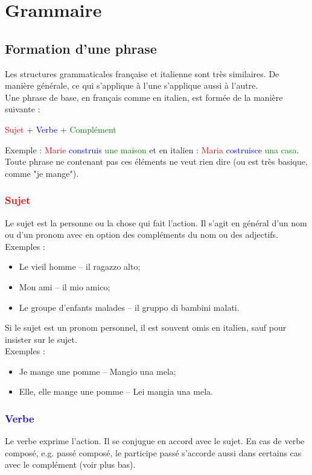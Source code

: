 \documentclass[12pt, openany]{report}
\begin{document}
\chapter{Grammaire}
\section{Formation d'une phrase}
Les structures grammaticales française et italienne sont très similaires. De manière générale, ce qui s'applique à l'une s'applique aussi à l'autre.\\
Une phrase de base, en français comme en italien, est formée de la manière suivante : 
\begin{center}
    \textcolor{red}{Sujet} + \textcolor{blue}{Verbe} + \textcolor{green}{Complément}
\end{center}
Exemple : \textcolor{red}{Marie} \textcolor{blue}{construis} \textcolor{green}{une maison} et en italien : \textcolor{red}{Maria} \textcolor{blue}{costruisce} \textcolor{green}{una casa}.
Toute phrase ne contenant pas ces éléments ne veut rien dire (ou est très basique, comme "je mange").
\subsection{\textcolor{red}{Sujet}}
Le sujet est la personne ou la chose qui fait l'action. Il s'agit en général d'un nom ou d'un pronom avec en option des compléments du nom ou des adjectifs.\\ Exemples : 
\begin{itemize}
    \item Le vieil homme -- il ragazzo alto;
    \item Mon ami -- il mio amico;
    \item Le groupe d'enfants malades -- il gruppo di bambini malati.
\end{itemize}
Si le sujet est un pronom personnel, il est souvent omis en italien, sauf pour insister sur le sujet.\\ Exemples : 
\begin{itemize}
    \item Je mange une pomme -- Mangio una mela;
    \item Elle, elle mange une pomme -- Lei mangia una mela.
\end{itemize}
\subsection{\textcolor{blue}{Verbe}}
Le verbe exprime l'action. Il se conjugue en accord avec le sujet. En cas de verbe composé, e.g. passé composé, le participe passé s'accorde aussi dans certains cas avec le complément (voir plus bas). 
\end{document}
